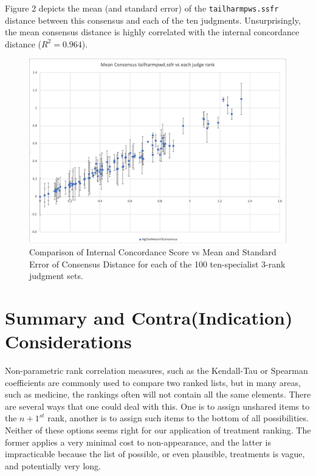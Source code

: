 \documentclass{article}
\begin{document}
Figure 2 depicts the mean (and standard error) of the \texttt{tailharmpws.ssfr} distance between this consensus and each of the ten judgments. Unsurprisingly, the mean consensus distance is highly correlated with the internal concordance distance ($R^2=0.964$). 

\begin{figure}[ht!]
  \includegraphics[scale=0.5]{"20220504_ConsensusComparison"}
  \caption{Comparison of Internal Concordance Score vs Mean and Standard Error of Consensus Distance for each of the 100 ten-specialist 3-rank judgment sets.}
\end{figure}

\newpage
\section{Summary and Contra(Indication) Considerations}

Non-parametric rank correlation measures, such as the Kendall-Tau or Spearman coefficients are commonly used to compare two ranked lists, but in many areas, such as medicine, the rankings often will not contain all the same elements. There are several ways that one could deal with this. One is to assign unshared items to the $n+1^{st}$ rank, another is to assign such items to the bottom of all possibilities. Neither of these options seems right for our application of treatment ranking. The former applies a very minimal cost to non-appearance, and the latter is impracticable because the list of possible, or even plausible, treatments is vague, and potentially very long. 
\end{document}
